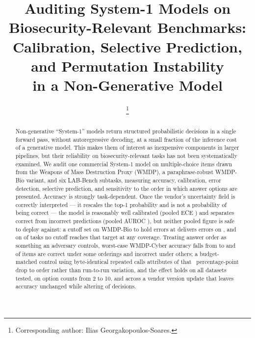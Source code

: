 \documentclass[conference]{IEEEtran}
\begin{document}
\title{Auditing System-1 Models on Biosecurity-Relevant Benchmarks:\\
Calibration, Selective Prediction, and Permutation Instability\\
in a Non-Generative Model}

\author{%
\thanks{Corresponding author: Ilias Georgakopoulos-Soares.}
}

\maketitle

\begin{abstract}
Non-generative ``System-1'' models return structured probabilistic decisions in a single
forward pass, without autoregressive decoding, at a small fraction of the inference cost of
a generative model. This makes them of interest as inexpensive components in larger
pipelines, but their reliability on biosecurity-relevant tasks has not been systematically
examined. We audit one commercial System-1 model on \statNItems{} multiple-choice items
drawn from the Weapons of Mass Destruction Proxy (WMDP), a paraphrase-robust WMDP-Bio
variant, and six LAB-Bench subtasks, measuring accuracy, calibration, error detection,
selective prediction, and sensitivity to the order in which answer options are presented.
Accuracy is strongly task-dependent. Once the vendor's uncertainty field is correctly
interpreted --- it rescales the top-1 probability and is not a probability of being correct
--- the model is reasonably well calibrated (pooled ECE \statEcePmax{}) and separates
correct from incorrect predictions (pooled AUROC \statAurocPooled{}), but neither pooled
figure is safe to deploy against: a cutoff set on WMDP-Bio to hold errors at
\statThrTarget{} delivers \statThrBioWorst{} errors on \statThrBioWorstLabel{}, and on
\statThrNUnachievable{} of \statThrNDatasets{} tasks no cutoff reaches that target at any
coverage. Treating answer order as something an adversary controls, worst-case WMDP-Cyber
accuracy falls from \statAtkSingleCyber{} to \statAtkWorstRotCyber{} and
\statAtkSteerRotCyber{} of items are correct under some orderings and incorrect under
others; a budget-matched control using byte-identical repeated calls attributes
\statAtkOrderDropCyber{} of that \statAtkDropRotCyber{}~percentage-point drop to order
rather than run-to-run variation, and the effect holds on all
\statAtkNDatasets{} datasets tested, on option counts from 2 to 10, and across a vendor
version update that leaves accuracy unchanged while altering
\statVerDisagreeCyber{} of decisions.
\end{abstract}
\end{document}
